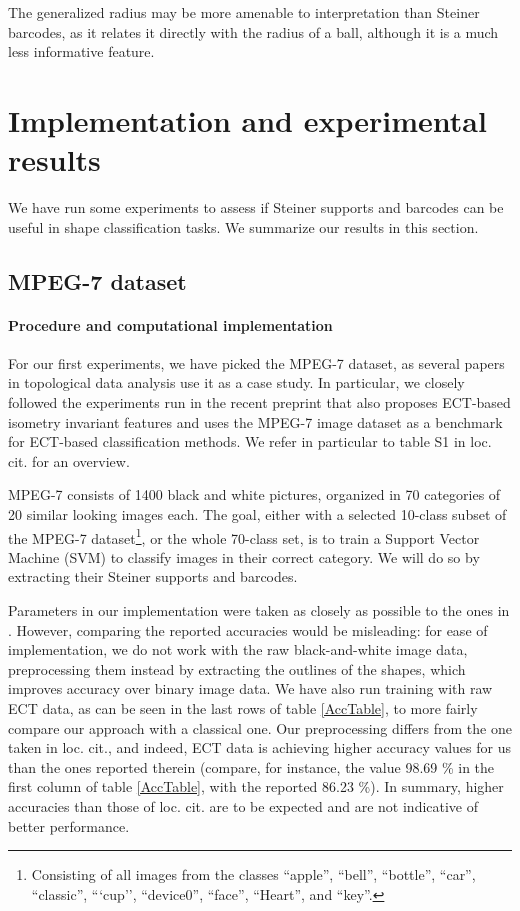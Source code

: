 \documentclass[a4paper]{article}
\begin{document}
The generalized radius may be more amenable to interpretation than Steiner barcodes, as it relates it directly with the radius of a ball, although it is a much less informative feature. 

\section{Implementation and experimental results}
\label{SectExperiment}
We have run some experiments to assess if Steiner supports and barcodes can be useful in shape classification tasks. We summarize our results in this section.
\subsection{MPEG-7 dataset}
\paragraph{Procedure and computational implementation}  For our first experiments, we have picked the MPEG-7 dataset\cite{MPEG}, as several papers in topological data analysis use it as a case study. In particular, we closely followed the experiments run in the recent preprint \cite{yang_topological_2026} that also proposes ECT-based isometry invariant features and uses the MPEG-7 image dataset as a benchmark for ECT-based classification methods. We refer in particular to table S1 in loc. cit. for an overview.

MPEG-7 consists of 1400 black and white pictures, organized in 70 categories of 20 similar looking images each. The goal, either with a selected 10-class subset of the MPEG-7 dataset\footnote{Consisting of all images from the classes ``apple'', ``bell'', ``bottle'', ``car'', ``classic'', ```cup'', ``device0'', ``face'', ``Heart'', and ``key''.}, or the whole 70-class set, is to train a Support Vector Machine (SVM) to classify images in their correct category. We will do so by extracting their Steiner supports and barcodes.

Parameters in our implementation were taken as closely as possible to the ones in \cite{yang_topological_2026}. However, comparing the reported accuracies would be misleading: for ease of implementation, we do not work with the raw black-and-white image data, preprocessing them instead by extracting the outlines of the shapes, which improves accuracy over binary image data. We have also run training with raw ECT data, as can be seen in the last rows of table \ref{AccTable}, to more fairly compare our approach with a classical one. Our preprocessing differs from the one taken in loc. cit., and indeed, ECT data is achieving higher accuracy values for us than the ones reported therein (compare, for instance, the value 98.69 \% in the first column of table \ref{AccTable}, with the reported 86.23 \%). In summary, higher accuracies than those of loc. cit. are to be expected and are not indicative of better performance.
\end{document}

